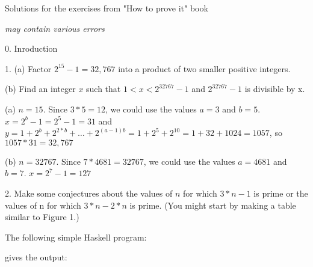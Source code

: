 \documentclass{article}
\begin{document}
\vspace*{\fill}
\centerline{\sc \large Solutions for the exercises from "How to prove it" book }
\centerline{\textit{may contain various errors}}
\vspace*{\fill}
%
\pagebreak
\centerline{\sc \large 0. Inroduction}
\vspace{50pt}

1. (a) Factor $2^{15} - 1 = 32,767$ into a product of two smaller positive integers.

\hspace{12pt}(b) Find an integer $x$ such that $1 < x < 2^{32767} − 1$ and $2^{32767} - 1$ is divisible by x.
\vspace{20pt}


(a) $n = 15$. Since $3 * 5 = 12$, we could use the values $a = 3$ and $b = 5$.
$x = 2^b - 1 = 2^5 - 1 = 31$ and $y = 1 + 2^b + 2^{2*b} + \dotso + 2^{(a-1)b} = 1 + 2^5 + 2^{10} = 1 + 32 + 1024 = 1057$,
so $1057 * 31 = 32,767$
\vspace{10pt}

(b) $n=32767$. Since $7 * 4681 = 32767$, we could use the values $a = 4681$ and $b = 7$.
$x = 2^7 - 1 = 127$
\vspace{40pt}

2. Make some conjectures about the values of $n$ for which $3*n - 1$ is prime or
the values of n for which $3*n - 2*n$ is prime. (You might start by making a
table similar to Figure 1.)
\vspace{20pt}

The following simple Haskell program:

gives the output:
\end{document}
